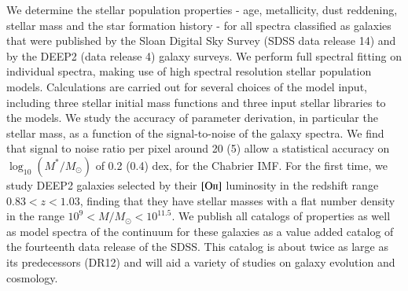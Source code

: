 \documentclass[onecolumn]{aa}
\newcommand{\OII}{$\left[\mathrm{O\textrm{\textsc{ii}}}\right]$\xspace}
\begin{document}
\abstract
{}
{We determine the stellar population properties - age, metallicity, dust reddening, stellar mass and the star formation history - for all spectra classified as galaxies that were published by the Sloan Digital Sky Survey (SDSS data release 14) and by the DEEP2 (data release 4) galaxy surveys.}
{We perform full spectral fitting on individual spectra, making use of high spectral resolution stellar population models. Calculations are carried out for several choices of the model input, including three stellar initial mass functions and three input stellar libraries to the models. We study the accuracy of parameter derivation, in particular the stellar mass, as a function of the signal-to-noise of the galaxy spectra. We find that signal to noise ratio per pixel around 20 (5) allow a statistical accuracy on $\log_{10}(M^{*}/M_{\odot})$ of 0.2 (0.4) dex, for the Chabrier IMF.}
{%
For the first time, we study DEEP2 galaxies selected by their \OII luminosity in the redshift range $0.83<z<1.03$, finding that they have stellar masses with a flat number density in the range $10^9<M/M_{\odot}<10^{11.5}$. 
We publish all catalogs of properties as well as model spectra of the continuum for these galaxies as a value added catalog of the fourteenth data release of the SDSS. This catalog is about twice as large as its predecessors (DR12) and will aid a variety of studies on galaxy evolution and cosmology.}
{}

\maketitle

\end{document}
